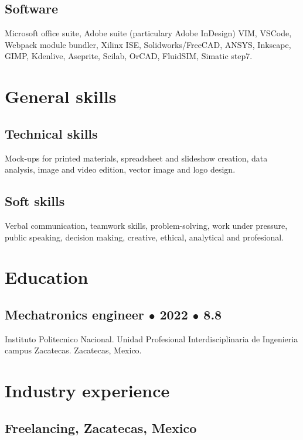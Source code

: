 \documentclass{article}
\begin{document}
    \subsection{Software}

    Microsoft office suite, Adobe suite (particulary Adobe InDesign) VIM, VSCode, Webpack module bundler, Xilinx ISE, Solidworks/FreeCAD, ANSYS, Inkscape, GIMP, Kdenlive, Aseprite, Scilab, OrCAD, FluidSIM, Simatic step7.


  \section{General skills}

  \subsection{Technical skills}
  Mock-ups for printed materials, spreadsheet and slideshow creation, data analysis, image and video edition, vector image and logo design.

  \subsection{Soft skills}
  Verbal communication, teamwork skills, problem-solving, work under pressure, public speaking, decision making, creative, ethical, analytical and profesional.%


  \section{Education}%

  \subsection{Mechatronics engineer $\bullet$ 2022 $\bullet$ 8.8}
  Instituto Politecnico Nacional.
  Unidad Profesional Interdisciplinaria de Ingenieria campus Zacatecas.
  Zacatecas, Mexico.%


  \section{Industry experience}%

  \subsection{\textbf{Freelancing}, Zacatecas, Mexico}
\end{document}
